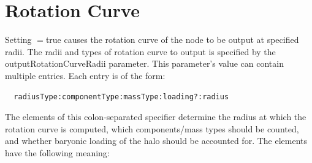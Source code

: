 \section{Rotation Curve}

Setting {\normalfont \ttfamily [outputRotationCurveData]}$=${\normalfont \ttfamily true} causes the rotation curve of the node to be output at specified radii. The radii and types of rotation curve to output is specified by the {\normalfont \ttfamily outputRotationCurveRadii} parameter. This parameter's value can contain multiple entries. Each entry is of the form:
\begin{verbatim}
  radiusType:componentType:massType:loading?:radius
\end{verbatim}
The elements of this colon-separated specifier determine the radius at which the rotation curve is computed, which components/mass types should be counted, and whether baryonic loading of the halo should be accounted for. The elements have the following meaning:

